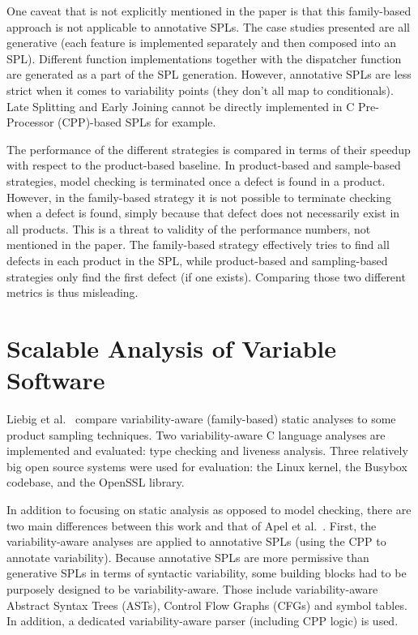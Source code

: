 \documentclass[11pt]{article}
\begin{document}
One caveat that is not explicitly mentioned in the paper is that this family-based approach is not applicable to annotative SPLs. The case studies presented are all generative (each feature is implemented separately and then composed into an SPL). Different function implementations together with the dispatcher function are generated as a part of the SPL generation. However, annotative SPLs are less strict when it comes to variability points (they don't all map to conditionals). Late Splitting and Early Joining cannot be directly implemented in C Pre-Processor (CPP)-based SPLs for example.

The performance of the different strategies is compared in terms of their speedup with respect to the product-based baseline. In product-based and sample-based strategies, model checking is terminated once a defect is found in a product. However, in the family-based strategy it is not possible to terminate checking when a defect is found, simply because that defect does not necessarily exist in all products. This is a threat to validity of the performance numbers, not mentioned in the paper. The family-based strategy effectively tries to find all defects in each product in the SPL, while product-based and sampling-based strategies only find the first defect (if one exists). Comparing those two different metrics is thus misleading.

\section{Scalable Analysis of Variable Software}
Liebig et al.~\cite{Liebig:2013} compare variability-aware (family-based) static analyses to some product sampling techniques. Two variability-aware C language analyses are implemented and evaluated: type checking and liveness analysis. Three relatively big open source systems were used for evaluation: the Linux kernel, the Busybox codebase, and the OpenSSL library.

In addition to focusing on static analysis as opposed to model checking, there are two main differences between this work and that of Apel et al.~\cite{Apel:2013}. First, the variability-aware analyses are applied to annotative SPLs (using the CPP to annotate variability). Because annotative SPLs are more permissive than generative SPLs in terms of syntactic variability, some building blocks had to be purposely designed to be variability-aware. Those include variability-aware Abstract Syntax Trees (ASTs), Control Flow Graphs (CFGs) and symbol tables. In addition, a dedicated variability-aware parser (including CPP logic) is used.
\end{document}
